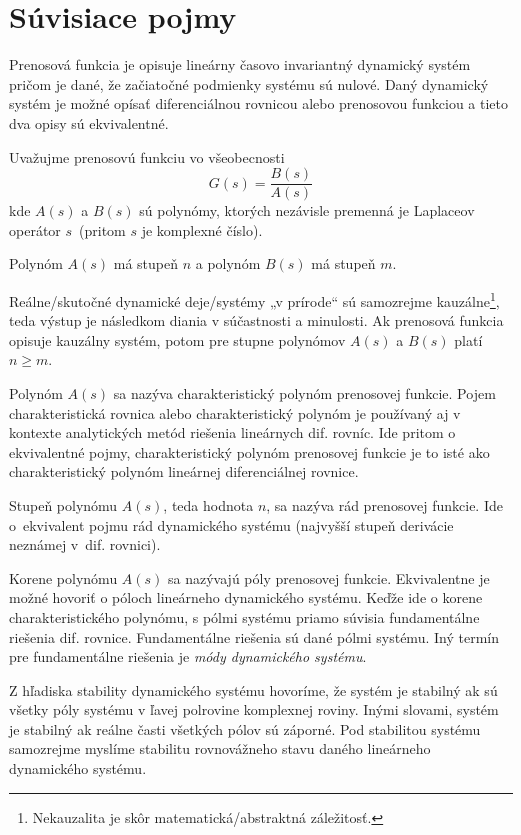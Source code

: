 \documentclass[a4paper, 10pt, ]{article}
\begin{document}
\section{Súvisiace pojmy}

Prenosová funkcia je opisuje lineárny časovo invariantný dynamický systém pričom je dané, že začiatočné podmienky systému sú nulové. Daný dynamický systém je možné opísať diferenciálnou rovnicou alebo prenosovou funkciou a tieto dva opisy sú ekvivalentné. 

Uvažujme prenosovú funkciu vo všeobecnosti
\begin{equation}
    G(s) = \frac{B(s)}{A(s)}
\end{equation}
kde $A(s)$ a $B(s)$ sú polynómy, ktorých nezávisle premenná je Laplaceov operátor $s$~(pritom $s$ je komplexné číslo). 

Polynóm $A(s)$ má stupeň $n$ a polynóm $B(s)$ má stupeň $m$.

Reálne/skutočné dynamické deje/systémy „v prírode“ sú samozrejme kauzálne\footnote{Nekauzalita je skôr matematická/abstraktná záležitosť.}, teda výstup je následkom diania v súčastnosti a minulosti. Ak prenosová funkcia opisuje kauzálny systém, potom pre stupne polynómov $A(s)$ a $B(s)$ platí $n \geq m$.

Polynóm $A(s)$ sa nazýva charakteristický polynóm prenosovej funkcie. Pojem charakteristická rovnica alebo charakteristický polynóm je používaný aj v kontexte analytických metód riešenia lineárnych dif. rovníc. Ide pritom o ekvivalentné pojmy, charakteristický polynóm prenosovej funkcie je to isté ako charakteristický polynóm lineárnej diferenciálnej rovnice.

Stupeň polynómu $A(s)$, teda hodnota $n$, sa nazýva rád prenosovej funkcie. Ide o~ekvivalent pojmu rád dynamického systému (najvyšší stupeň derivácie neznámej v~dif. rovnici).

Korene polynómu $A(s)$ sa nazývajú póly prenosovej funkcie. Ekvivalentne je možné hovoriť o póloch lineárneho dynamického systému. Keďže ide o korene charakteristického polynómu, s pólmi systému priamo súvisia fundamentálne riešenia dif. rovnice. Fundamentálne riešenia sú dané pólmi systému. Iný termín pre fundamentálne riešenia je \emph{módy dynamického systému}.

Z hľadiska stability dynamického systému hovoríme, že systém je stabilný ak sú všetky póly systému v ľavej polrovine komplexnej roviny. Inými slovami, systém je stabilný ak reálne časti všetkých pólov sú záporné. Pod stabilitou systému samozrejme myslíme stabilitu rovnovážneho stavu daného lineárneho dynamického systému.
\end{document}
